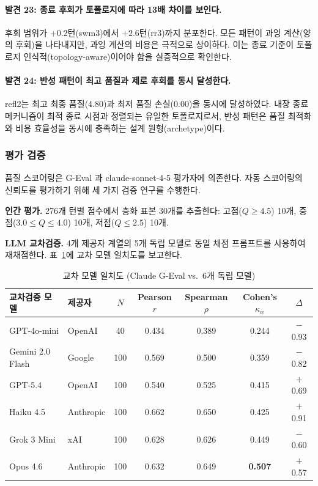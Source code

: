 \documentclass[a4paper,11pt]{article}
\begin{document}
\paragraph{발견 23: 종료 후회가 토폴로지에 따라 13배 차이를 보인다.}
후회 범위가 $+0.2$턴(swm3)에서 $+2.6$턴(rr3)까지 분포한다. 모든 패턴이 과잉 계산(양의 후회)을 나타내지만, 과잉 계산의 비용은 극적으로 상이하다. 이는 종료 기준이 토폴로지 인식적(topology-aware)이어야 함을 실증적으로 확인한다.

\paragraph{발견 24: 반성 패턴이 최고 품질과 제로 후회를 동시 달성한다.}
refl2는 최고 최종 품질(4.80)과 최저 품질 손실(0.00)을 동시에 달성하였다. 내장 종료 메커니즘이 최적 종료 시점과 정렬되는 유일한 토폴로지로서, 반성 패턴은 품질 최적화와 비용 효율성을 동시에 충족하는 설계 원형(archetype)이다.

\subsubsection{평가 검증}

품질 스코어링은 G-Eval \citep{liu2023geval}과 claude-sonnet-4-5 평가자에 의존한다. 자동 스코어링의 신뢰도를 평가하기 위해 세 가지 검증 연구를 수행한다.

\textbf{인간 평가.} 276개 턴별 점수에서 층화 표본 30개를 추출한다: 고점($Q \geq 4.5$) 10개, 중점($3.0 \leq Q \leq 4.0$) 10개, 저점($Q \leq 2.5$) 10개.

\textbf{LLM 교차검증.} 4개 제공자 계열의 5개 독립 모델로 동일 채점 프롬프트를 사용하여 재채점한다. 표~\ref{tab:cross-model-agreement}에 교차 모델 일치도를 보고한다.

\begin{table}[H]
\centering
\caption{교차 모델 일치도 (Claude G-Eval vs.\ 6개 독립 모델)}
\label{tab:cross-model-agreement}
{\small
\begin{tabular}{llccccc}
\toprule
교차검증 모델 & 제공자 & $N$ & Pearson $r$ & Spearman $\rho$ & Cohen's $\kappa_w$ & $\Delta$ \\
\midrule
GPT-4o-mini      & OpenAI    & 40  & 0.434 & 0.389 & 0.244 & $-$0.93 \\
Gemini 2.0 Flash & Google    & 100 & 0.569 & 0.500 & 0.359 & $-$0.82 \\
GPT-5.4          & OpenAI    & 100 & 0.540 & 0.525 & 0.415 & $+$0.69 \\
Haiku 4.5        & Anthropic & 100 & 0.662 & 0.650 & 0.425 & $+$0.91 \\
Grok 3 Mini      & xAI       & 100 & 0.628 & 0.626 & 0.449 & $-$0.60 \\
Opus 4.6         & Anthropic & 100 & 0.632 & 0.649 & \textbf{0.507} & $+$0.57 \\
\bottomrule
\end{tabular}
}
\end{table}
\end{document}
